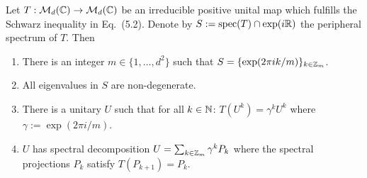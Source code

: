 \documentclass[11pt,a4paper]{article}
\theoremstyle{plain}
\theoremstyle{definition}
\theoremstyle{remark}
\begin{document}
\begin{theorem}
    Let $T:\mathcal{M}_d(\mathbb{C})\to\mathcal{M}_d(\mathbb{C})$ be an irreducible positive unital map which fulfills
    the Schwarz inequality in Eq.~(5.2). Denote by $S:=\operatorname{spec}(T)\cap \exp(i\mathbb{R})$ the
    peripheral spectrum of $T$. Then
    \begin{enumerate}
        \item There is an integer $m\in\{1,\dots,d^2\}$ such that
              $S=\{\exp(2\pi i k/m)\}_{k\in\mathbb{Z}_m}$.
        \item All eigenvalues in $S$ are non-degenerate.
        \item There is a unitary $U$ such that for all $k\in\mathbb{N}$: $T(U^k)=\gamma^k U^k$
              where $\gamma:=\exp(2\pi i/m)$.
        \item $U$ has spectral decomposition $U=\sum_{k\in\mathbb{Z}_m}\gamma^k P_k$ where the
              spectral projections $P_k$ satisfy $T(P_{k+1})=P_k$.
    \end{enumerate}
\end{theorem}
\end{document}
